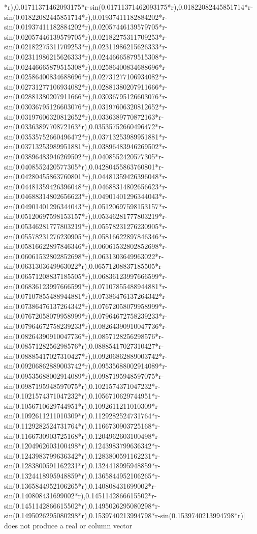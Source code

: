 \documentclass{article}
\begin{document}
\begin{eulernotebook}
\begin{eulercomment}
\begin{eulercomment}
\begin{eulercomment}
\begin{eulercomment}
\begin{eulercomment}
\begin{eulercomment}
\begin{euleroutput}
*r),0.01711371462093175*r-sin(0.01711371462093175*r),0.01822082445851714*r-sin(0.01822082445851714*r),0.01937411182884202*r-sin(0.01937411182884202*r),0.02057446139579705*r-sin(0.02057446139579705*r),0.02182275311709253*r-sin(0.02182275311709253*r),0.02311986215626333*r-sin(0.02311986215626333*r),0.02446665879515308*r-sin(0.02446665879515308*r),0.02586400834688696*r-sin(0.02586400834688696*r),0.02731277106934082*r-sin(0.02731277106934082*r),0.02881380207911666*r-sin(0.02881380207911666*r),0.03036795126603076*r-sin(0.03036795126603076*r),0.03197606320812652*r-sin(0.03197606320812652*r),0.0336389770872163*r-sin(0.0336389770872163*r),0.03535752660496472*r-sin(0.03535752660496472*r),0.03713253989951881*r-sin(0.03713253989951881*r),0.03896483946269502*r-sin(0.03896483946269502*r),0.0408552420577305*r-sin(0.0408552420577305*r),0.04280455863760801*r-sin(0.04280455863760801*r),0.04481359426396048*r-sin(0.04481359426396048*r),0.04688314802656623*r-sin(0.04688314802656623*r),0.04901401296344043*r-sin(0.04901401296344043*r),0.05120697598153157*r-sin(0.05120697598153157*r),0.05346281777803219*r-sin(0.05346281777803219*r),0.05578231276230905*r-sin(0.05578231276230905*r),0.05816622897846346*r-sin(0.05816622897846346*r),0.06061532802852698*r-sin(0.06061532802852698*r),0.0631303649963022*r-sin(0.0631303649963022*r),0.06571208837185505*r-sin(0.06571208837185505*r),0.06836123997666599*r-sin(0.06836123997666599*r),0.07107855488944881*r-sin(0.07107855488944881*r),0.07386476137264342*r-sin(0.07386476137264342*r),0.07672058079958999*r-sin(0.07672058079958999*r),0.07964672758239233*r-sin(0.07964672758239233*r),0.08264390910047736*r-sin(0.08264390910047736*r),0.0857128256298576*r-sin(0.0857128256298576*r),0.08885417027310427*r-sin(0.08885417027310427*r),0.09206862889003742*r-sin(0.09206862889003742*r),0.09535688002914089*r-sin(0.09535688002914089*r),0.0987195948597075*r-sin(0.0987195948597075*r),0.1021574371047232*r-sin(0.1021574371047232*r),0.1056710629744951*r-sin(0.1056710629744951*r),0.1092611211010309*r-sin(0.1092611211010309*r),0.1129282524731764*r-sin(0.1129282524731764*r),0.1166730903725168*r-sin(0.1166730903725168*r),0.1204962603100498*r-sin(0.1204962603100498*r),0.1243983799636342*r-sin(0.1243983799636342*r),0.1283800591162231*r-sin(0.1283800591162231*r),0.1324418995948859*r-sin(0.1324418995948859*r),0.1365844952106265*r-sin(0.1365844952106265*r),0.140808431699002*r-sin(0.140808431699002*r),0.1451142866615502*r-sin(0.1451142866615502*r),0.1495026295080298*r-sin(0.1495026295080298*r),0.1539740213994798*r-sin(0.1539740213994798*r)] does not produce a real or column vector
  

\end{euleroutput}
\end{eulercomment}
\end{eulercomment}
\end{eulercomment}
\end{eulercomment}
\end{eulercomment}
\end{eulercomment}
\end{eulernotebook}
\end{document}
